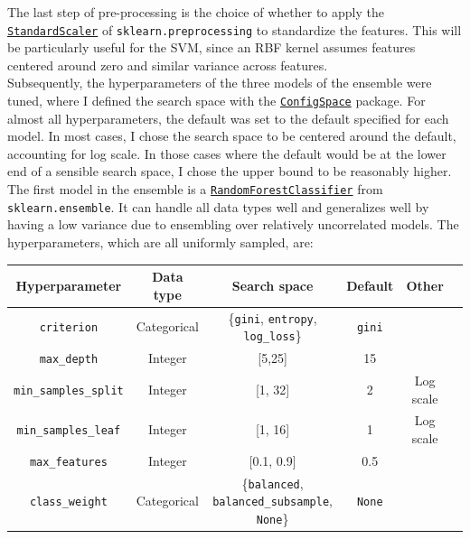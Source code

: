 \documentclass[11pt]{article}
\begin{document}
The last step of pre-processing is  the choice of whether to apply the \href{https://scikit-learn.org/stable/modules/generated/sklearn.preprocessing.StandardScaler.html}{\texttt{StandardScaler}} of \texttt{sklearn.preprocessing} to standardize the features. This will be particularly useful for the SVM, since an RBF kernel assumes features centered around zero and similar variance across features. \\

Subsequently, the hyperparameters of the three models of the ensemble were tuned, where I defined the search space with the \href{https://automl.github.io/ConfigSpace/main/}{\texttt{ConfigSpace}} package. For almost all hyperparameters, the default was set to the default specified for each model. In most cases, I chose the search space to be centered around the default, accounting for log scale. In those cases where the default would be at the lower end of a sensible search space, I chose the upper bound to be reasonably higher. \\

The first model in the ensemble is a \href{https://scikit-learn.org/stable/modules/generated/sklearn.ensemble.RandomForestClassifier.html}{\texttt{RandomForestClassifier}} from \texttt{sklearn.ensemble}. It can handle all data types well and generalizes well by having a low variance due to ensembling over relatively uncorrelated models. The hyperparameters, which are all uniformly sampled, are:

\begin{table}[H]
\centering
\begin{tabular}{ | c | c | c | c | c | c | }
 \hline
  Hyperparameter & Data type & Search space & Default & Other \\
 \hline
 \texttt{criterion} & Categorical & \{\texttt{gini}, \texttt{entropy}, \texttt{log\_loss}\} & \texttt{gini} &   \\ 
 \texttt{max\_depth}  & Integer & [5,25] & 15 &  \\ 
 \texttt{min\_samples\_split} & Integer & [1, 32] & 2 & Log scale \\ 
 \texttt{min\_samples\_leaf} & Integer & [1, 16] & 1 & Log scale  \\ 
 \texttt{max\_features} & Integer & [0.1, 0.9] & 0.5 &   \\  
 \texttt{class\_weight} & Categorical & \{\texttt{balanced}, \texttt{balanced\_subsample}, \texttt{None}\}  & \texttt{None} &  \\ 
 \hline
\end{tabular}
\end{table}
\end{document}
